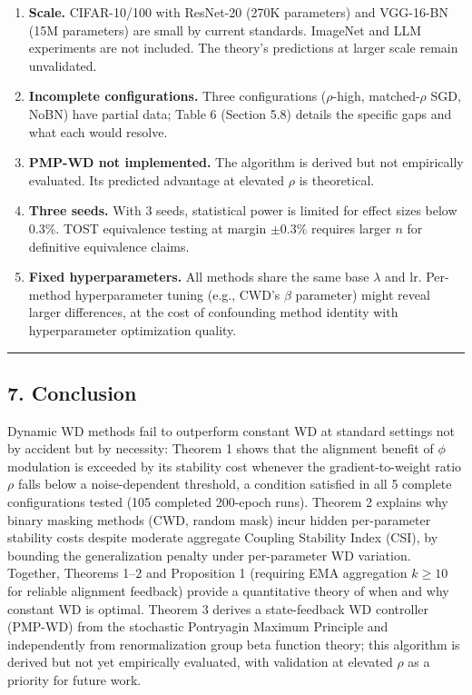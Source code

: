 \documentclass[
]{article}
\begin{document}
\begin{enumerate}
\def\labelenumi{\arabic{enumi}.}
\item
  \textbf{Scale.} CIFAR-10/100 with ResNet-20 (270K parameters) and
  VGG-16-BN (15M parameters) are small by current standards. ImageNet
  and LLM experiments are not included. The theory's predictions at
  larger scale remain unvalidated.
\item
  \textbf{Incomplete configurations.} Three configurations
  (\(\rho\)-high, matched-\(\rho\) SGD, NoBN) have partial data; Table 6
  (Section 5.8) details the specific gaps and what each would resolve.
\item
  \textbf{PMP-WD not implemented.} The algorithm is derived but not
  empirically evaluated. Its predicted advantage at elevated \(\rho\) is
  theoretical.
\item
  \textbf{Three seeds.} With 3 seeds, statistical power is limited for
  effect sizes below 0.3\%. TOST equivalence testing at margin
  \(\pm 0.3\%\) requires larger \(n\) for definitive equivalence claims.
\item
  \textbf{Fixed hyperparameters.} All methods share the same base
  \(\lambda\) and lr. Per-method hyperparameter tuning (e.g., CWD's
  \(\beta\) parameter) might reveal larger differences, at the cost of
  confounding method identity with hyperparameter optimization quality.
\end{enumerate}

\begin{center}\rule{0.5\linewidth}{0.5pt}\end{center}

\hypertarget{conclusion}{%
\subsection{7. Conclusion}\label{conclusion}}

Dynamic WD methods fail to outperform constant WD at standard settings
not by accident but by necessity: Theorem 1 shows that the alignment
benefit of \(\phi\) modulation is exceeded by its stability cost
whenever the gradient-to-weight ratio \(\rho\) falls below a
noise-dependent threshold, a condition satisfied in all 5 complete
configurations tested (105 completed 200-epoch runs). Theorem 2 explains
why binary masking methods (CWD, random mask) incur hidden per-parameter
stability costs despite moderate aggregate Coupling Stability Index
(CSI), by bounding the generalization penalty under per-parameter WD
variation. Together, Theorems 1--2 and Proposition 1 (requiring EMA
aggregation \(k \geq 10\) for reliable alignment feedback) provide a
quantitative theory of when and why constant WD is optimal. Theorem 3
derives a state-feedback WD controller (PMP-WD) from the stochastic
Pontryagin Maximum Principle and independently from renormalization
group beta function theory; this algorithm is derived but not yet
empirically evaluated, with validation at elevated \(\rho\) as a
priority for future work.
\end{document}
